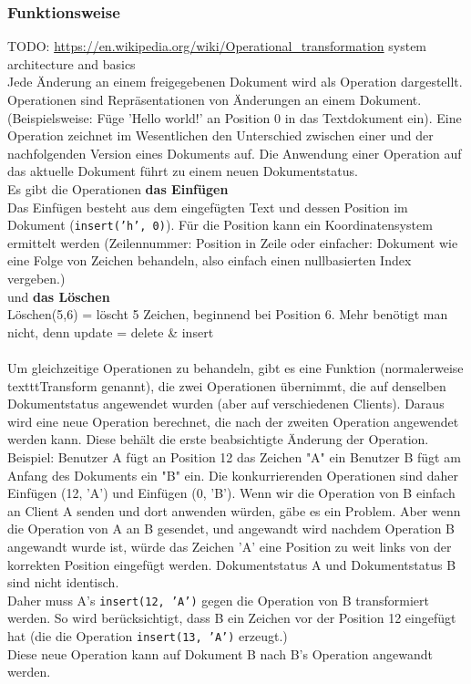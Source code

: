 \subsubsection{Funktionsweise}
TODO: \url{https://en.wikipedia.org/wiki/Operational_transformation} system architecture and basics\\
Jede Änderung an einem freigegebenen Dokument wird als Operation dargestellt. Operationen sind Repräsentationen von Änderungen an einem Dokument. (Beispielsweise: Füge 'Hello world!' an Position 0 in das Textdokument ein).  Eine Operation zeichnet im Wesentlichen den Unterschied zwischen einer und der nachfolgenden Version eines Dokuments auf. Die Anwendung einer Operation auf das aktuelle Dokument führt zu einem neuen Dokumentstatus.\\
Es gibt die Operationen \textbf{das Einfügen}\\
Das Einfügen besteht aus dem eingefügten Text und dessen Position im Dokument (\texttt{insert('h', 0)}).
Für die Position kann ein Koordinatensystem ermittelt werden (Zeilennummer: Position in Zeile oder einfacher: Dokument wie eine Folge von Zeichen behandeln, also einfach einen nullbasierten Index vergeben.)\\
und \textbf{das Löschen}\\
Löschen(5,6) = löscht 5 Zeichen, beginnend bei Position 6.
Mehr benötigt man nicht, denn update = delete \& insert\\\\
Um gleichzeitige Operationen zu behandeln, gibt es eine Funktion (normalerweise texttt{Transform} genannt), die zwei Operationen übernimmt, die auf denselben Dokumentstatus angewendet wurden (aber auf verschiedenen Clients).
Daraus wird eine neue Operation berechnet, die nach der zweiten Operation angewendet werden kann. Diese behält die erste beabsichtigte Änderung der Operation.
Beispiel:
Benutzer A fügt an Position 12 das Zeichen "A" ein
Benutzer B fügt am Anfang des Dokuments ein "B" ein.
Die konkurrierenden Operationen sind daher Einfügen (12, 'A') und Einfügen (0, 'B').
Wenn wir die Operation von B einfach an Client A senden und dort anwenden würden, gäbe es ein Problem.
Aber wenn die Operation von A an B gesendet, und angewandt wird nachdem Operation B angewandt wurde ist, würde das Zeichen 'A' eine Position zu weit links von der korrekten Position eingefügt werden.
Dokumentstatus A und Dokumentstatus B sind nicht identisch.\\
Daher muss A's \texttt{insert(12, 'A')} gegen die Operation von B transformiert werden. So wird berücksichtigt, dass B ein Zeichen vor der Position 12 eingefügt hat (die die Operation \texttt{insert(13, 'A')} erzeugt.)\\
Diese neue Operation kann auf Dokument B nach B's Operation angewandt werden.
